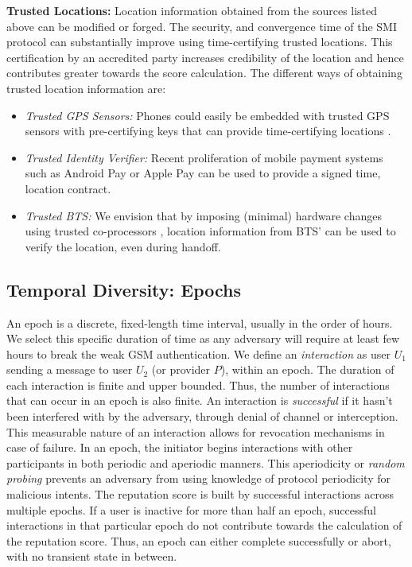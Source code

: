 \documentclass[letterpaper,twocolumn]{sig-alternate}
\begin{document}
\textbf{Trusted Locations:} Location information obtained from the sources listed above can be modified or forged. The security, and convergence time of the SMI protocol can substantially improve using time-certifying trusted locations. This certification by an accredited party increases credibility of the location and hence contributes greater towards the score calculation. The different ways of obtaining trusted location information are:
\vspace{-2mm}
\begin{itemize}
\itemsep-0.23em 
\item {\em Trusted GPS Sensors:} Phones could easily be embedded with trusted GPS sensors with pre-certifying keys that can provide time-certifying locations \cite{saroiu2010sensor}.

\item {\em Trusted Identity Verifier:} Recent proliferation of mobile payment systems such as Android Pay or Apple Pay can be used to provide a signed time, location contract. 

\item {\em Trusted BTS:} We envision that by imposing (minimal) hardware changes using trusted co-processors \cite{yee1995secure}, location information from BTS' can be used to verify the location, even during handoff.
\end{itemize}
\vspace{-2mm}

\subsection{Temporal Diversity: Epochs}
\label{time}

An epoch is a discrete, fixed-length time interval, usually in the order of hours. We select this specific duration of time as any adversary will require at least few hours to break the weak GSM authentication. We define an \textit{interaction} as user $U_1$ sending a message to user $U_2$ (or provider $P$), within an epoch. The duration of each interaction is finite and upper bounded. Thus, the number of interactions that can occur in an epoch is also finite. An interaction is \textit{successful} if it hasn't been interfered with by the adversary, through denial of channel or interception. This measurable nature of an interaction allows for revocation mechanisms in case of failure. In an epoch, the initiator begins interactions with other participants in both periodic and aperiodic manners. This aperiodicity or \textit{random probing} prevents an adversary from using knowledge of protocol periodicity for malicious intents. The reputation score is built by successful interactions across multiple epochs. If a user is inactive for more than half an epoch, successful interactions in that particular epoch do not contribute towards the calculation of the reputation score. Thus, an epoch can either complete successfully or abort, with no transient state in between.
\end{document}
